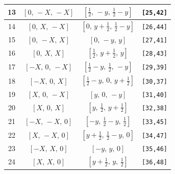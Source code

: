 \documentclass[fleqn,8pt]{jsarticle}
\begin{document}
\begin{longtable}{cccc}
13 & $\left[ 0,\, - X,\, - X \right]$ & $\left[ \frac{1}{2},\, - y,\, \frac{1}{2} - y \right]$ & {\tt [25,42]} \\ \hline
14 & $\left[ 0,\, X,\, - X \right]$ & $\left[ 0,\, y + \frac{1}{2},\, \frac{1}{2} - y \right]$ & {\tt [26,44]} \\ \hline
15 & $\left[ 0,\, - X,\, X \right]$ & $\left[ 0,\, - y,\, y \right]$ & {\tt [27,41]} \\ \hline
16 & $\left[ 0,\, X,\, X \right]$ & $\left[ \frac{1}{2},\, y + \frac{1}{2},\, y \right]$ & {\tt [28,43]} \\ \hline
17 & $\left[ - X,\, 0,\, - X \right]$ & $\left[ \frac{1}{2} - y,\, \frac{1}{2},\, - y \right]$ & {\tt [29,39]} \\ \hline
18 & $\left[ - X,\, 0,\, X \right]$ & $\left[ \frac{1}{2} - y,\, 0,\, y + \frac{1}{2} \right]$ & {\tt [30,37]} \\ \hline
19 & $\left[ X,\, 0,\, - X \right]$ & $\left[ y,\, 0,\, - y \right]$ & {\tt [31,40]} \\ \hline
20 & $\left[ X,\, 0,\, X \right]$ & $\left[ y,\, \frac{1}{2},\, y + \frac{1}{2} \right]$ & {\tt [32,38]} \\ \hline
21 & $\left[ - X,\, - X,\, 0 \right]$ & $\left[ - y,\, \frac{1}{2} - y,\, \frac{1}{2} \right]$ & {\tt [33,45]} \\ \hline
22 & $\left[ X,\, - X,\, 0 \right]$ & $\left[ y + \frac{1}{2},\, \frac{1}{2} - y,\, 0 \right]$ & {\tt [34,47]} \\ \hline
23 & $\left[ - X,\, X,\, 0 \right]$ & $\left[ - y,\, y,\, 0 \right]$ & {\tt [35,46]} \\ \hline
24 & $\left[ X,\, X,\, 0 \right]$ & $\left[ y + \frac{1}{2},\, y,\, \frac{1}{2} \right]$ & {\tt [36,48]} \\
\end{longtable}
\renewcommand{\arraystretch}{1.2}
\end{document}
